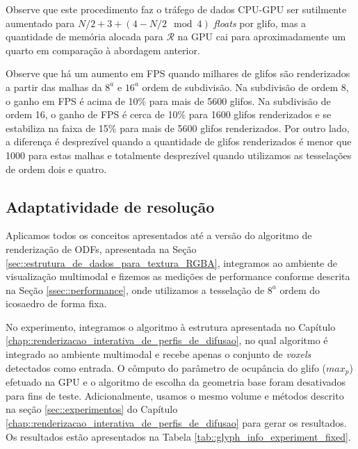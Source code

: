\documentclass[
    12pt,                %
    oneside,            %
    a4paper,            %
    english,            %
    french,                %
    spanish,            %
    brazil                %
    ]{abntex2}
\begin{document}
Observe que este procedimento faz o tráfego de dados CPU-GPU ser sutilmente aumentado para $N/2 + 3 + (4 -N/2 \mod{4})$ \textit{floats} por glifo, mas a quantidade de memória alocada para $\boldsymbol{\mathscr{R}}$ na GPU cai para aproximadamente um quarto em comparação à abordagem anterior.

Observe que há um aumento em FPS quando milhares de glifos são renderizados a partir das malhas da $8^a$ e $16^a$ ordem de subdivisão. Na subdivisão de ordem 8, o ganho em FPS é acima de 10\% para mais de 5600 glifos. Na subdivisão de ordem 16, o ganho de FPS é cerca de 10\% para 1600 glifos renderizados e se estabiliza na faixa de 15\% para mais de 5600 glifos renderizados. Por outro lado, a diferença é desprezível quando a quantidade de glifos renderizados é menor que 1000 para estas malhas e totalmente desprezível quando utilizamos as tesselações de ordem dois e quatro.




\subsection{Adaptatividade de resolução}
\label{sec::adaptatividade_de_resolucao}

Aplicamos todos os conceitos apresentados até a versão do algoritmo de renderização de ODFs, apresentada na Seção \ref{sec::estrutura_de_dados_para_textura_RGBA}, integramos ao ambiente de visualização multimodal e fizemos as medições de performance conforme descrita na Seção \ref{ssec::performance}, onde utilizamos a tesselação de $8^a$ ordem do icosaedro de forma fixa.

No experimento, integramos o algoritmo à estrutura apresentada no Capítulo \ref{chap::renderizacao_interativa_de_perfis_de_difusao}, no qual algoritmo é integrado ao ambiente multimodal e recebe apenas o conjunto de \textit{voxels} detectados como entrada. O cômputo do parâmetro de ocupância do glifo ($max_p$) efetuado na GPU e o algoritmo de escolha da geometria base foram desativados para fins de teste. Adicionalmente, usamos o mesmo volume e métodos descrito na seção \ref{sec::experimentos} do Capítulo \ref{chap::renderizacao_interativa_de_perfis_de_difusao} para gerar os resultados. Os resultados estão apresentados na Tabela \ref{tab::glyph_info_experiment_fixed}.
\end{document}
